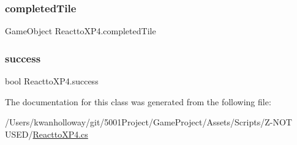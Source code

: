 \subsubsection{\texorpdfstring{completed\+Tile}{completedTile}}
{\footnotesize\ttfamily Game\+Object Reactto\+X\+P4.\+completed\+Tile}

\mbox{\label{class_reactto_x_p4_a285fc5dfa251d2a1a68155c8bd99752e}} 
\subsubsection{\texorpdfstring{success}{success}}
{\footnotesize\ttfamily bool Reactto\+X\+P4.\+success}



The documentation for this class was generated from the following file\+:\begin{DoxyCompactItemize}
\item 
/\+Users/kwanholloway/git/5001\+Project/\+Game\+Project/\+Assets/\+Scripts/\+Z-\/\+N\+O\+T U\+S\+E\+D/\hyperlink{_reactto_x_p4_8cs}{Reactto\+X\+P4.\+cs}\end{DoxyCompactItemize}

